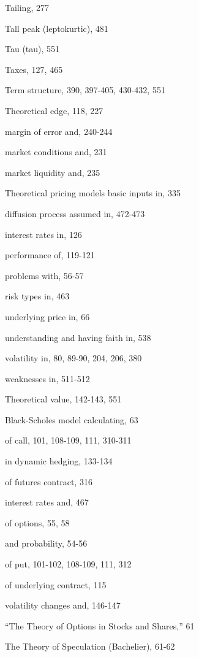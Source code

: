 \noindent Tailing, 277\par
\noindent Tall peak (leptokurtic), 481\par
\noindent Tau (tau), 551\par
\noindent Taxes, 127, 465\par
\noindent Term structure, 390, 397-405, 430-432, 551\par
\noindent Theoretical edge, 118, 227\par
\noindent margin of error and, 240-244\par
\noindent market conditions and, 231\par
\noindent market liquidity and, 235\par
\noindent Theoretical pricing models basic inputs in, 335\par
\noindent diffusion process assumed in, 472-473\par
\noindent interest rates in, 126\par
\noindent performance of, 119-121\par
\noindent problems with, 56-57\par
\noindent risk types in, 463\par
\noindent underlying price in, 66\par
\noindent understanding and having faith in, 538\par
\noindent volatility in, 80, 89-90, 204, 206, 380\par
\noindent weaknesses in, 511-512\par
\noindent Theoretical value, 142-143, 551\par
\noindent Black-Scholes model calculating, 63\par
\noindent of call, 101, 108-109, 111, 310-311\par
\noindent in dynamic hedging, 133-134\par
\noindent of futures contract, 316\par
\noindent interest rates and, 467\par
\noindent of options, 55, 58\par
\noindent and probability, 54-56\par
\noindent of put, 101-102, 108-109, 111, 312\par
\noindent of underlying contract, 115\par
\noindent volatility changes and, 146-147\par
\noindent ``The Theory of Options in Stocks and Shares,'' 61\par
\noindent The Theory of Speculation (Bachelier), 61-62\par

